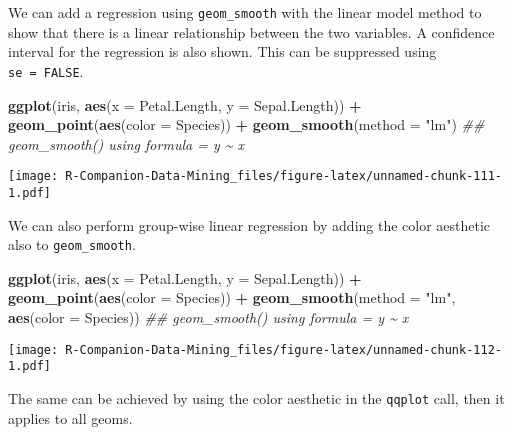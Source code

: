 \documentclass[
  notitlepage]{book}
\newenvironment{Shaded}{\begin{snugshade}}{\end{snugshade}}
\newcommand{\CommentTok}[1]{\textcolor[rgb]{0.56,0.35,0.01}{\textit{#1}}}
\newcommand{\DataTypeTok}[1]{\textcolor[rgb]{0.13,0.29,0.53}{#1}}
\newcommand{\KeywordTok}[1]{\textcolor[rgb]{0.13,0.29,0.53}{\textbf{#1}}}
\newcommand{\NormalTok}[1]{#1}
\newcommand{\OperatorTok}[1]{\textcolor[rgb]{0.81,0.36,0.00}{\textbf{#1}}}
\newcommand{\StringTok}[1]{\textcolor[rgb]{0.31,0.60,0.02}{#1}}
\begin{document}
We can add a regression using \texttt{geom\_smooth} with the
linear model method to show that there is a
linear relationship between the two variables. A confidence interval
for the regression is also shown.
This can be suppressed using \texttt{se\ =\ FALSE}.

\begin{Shaded}
\begin{Highlighting}[]
\KeywordTok{ggplot}\NormalTok{(iris, }\KeywordTok{aes}\NormalTok{(}\DataTypeTok{x =}\NormalTok{ Petal.Length, }\DataTypeTok{y =}\NormalTok{ Sepal.Length)) }\OperatorTok{+}\StringTok{ }
\StringTok{  }\KeywordTok{geom\_point}\NormalTok{(}\KeywordTok{aes}\NormalTok{(}\DataTypeTok{color =}\NormalTok{ Species)) }\OperatorTok{+}\StringTok{  }
\StringTok{  }\KeywordTok{geom\_smooth}\NormalTok{(}\DataTypeTok{method =} \StringTok{"lm"}\NormalTok{)}
\CommentTok{\#\# \textasciigrave{}geom\_smooth()\textasciigrave{} using formula = \textquotesingle{}y \textasciitilde{} x\textquotesingle{}}
\end{Highlighting}
\end{Shaded}

\texttt{[image: R-Companion-Data-Mining\_files/figure-latex/unnamed-chunk-111-1.pdf]}

We can also perform group-wise linear regression by adding the color
aesthetic also to \texttt{geom\_smooth}.

\begin{Shaded}
\begin{Highlighting}[]
\KeywordTok{ggplot}\NormalTok{(iris, }\KeywordTok{aes}\NormalTok{(}\DataTypeTok{x =}\NormalTok{ Petal.Length, }\DataTypeTok{y =}\NormalTok{ Sepal.Length)) }\OperatorTok{+}\StringTok{ }
\StringTok{  }\KeywordTok{geom\_point}\NormalTok{(}\KeywordTok{aes}\NormalTok{(}\DataTypeTok{color =}\NormalTok{ Species)) }\OperatorTok{+}\StringTok{  }
\StringTok{  }\KeywordTok{geom\_smooth}\NormalTok{(}\DataTypeTok{method =} \StringTok{"lm"}\NormalTok{, }\KeywordTok{aes}\NormalTok{(}\DataTypeTok{color =}\NormalTok{ Species))}
\CommentTok{\#\# \textasciigrave{}geom\_smooth()\textasciigrave{} using formula = \textquotesingle{}y \textasciitilde{} x\textquotesingle{}}
\end{Highlighting}
\end{Shaded}

\texttt{[image: R-Companion-Data-Mining\_files/figure-latex/unnamed-chunk-112-1.pdf]}

The same can be achieved by using the color aesthetic in the \texttt{qqplot} call,
then it applies to all geoms.
\end{document}
